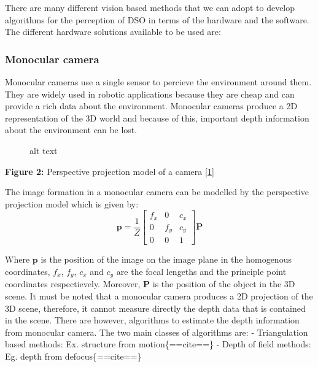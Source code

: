 There are many different vision based methods that we can adopt to
develop algorithms for the perception of DSO in terms of the hardware
and the software. The different hardware solutions available to be used
are:

\subsubsection{Monocular camera}\label{monocular-camera}

Monocular cameras use a single sensor to percieve the environment around
them. They are widely used in robotic applications because they are
cheap and can provide a rich data about the environment. Monocular
cameras produce a 2D representation of the 3D world and because of this,
important depth information about the environment can be lost.

\begin{figure}
\centering
{}
\caption{alt text}
\end{figure}

\textbf{Figure 2:} Perspective projection model of a camera
\href{https://jordicenzano.name/front-test/2d-3d-paradigm-overview-2011/camera-model/}{{[}1{]}}

The image formation in a monocular camera can be modelled by the
perspective projection model which is given by: \[
\mathbf{p} = \frac{1}{Z}\begin{bmatrix}
f_x & 0 & c_x  \\
 0 & f_y & c_y \\ 
 0 &0& 1
 \end{bmatrix} \mathbf{P}
\]

Where \(\mathbf{p}\) is the position of the image on the image plane in
the homogenous coordinates, \(f_x\), \(f_y\), \(c_x\) and \(c_y\) are
the focal lengeths and the principle point coordinates respectievely.
Moreover, \(\mathbf{P}\) is the position of the object in the 3D scene.
It must be noted that a monocular camera produces a 2D projection of the
3D scene, therefore, it cannot measure directly the depth data that is
contained in the scene. There are however, algorithms to estimate the
depth information from monocular camera. The two main classes of
algorithms are: - Triangulation based methods: Ex. structure from
motion\{==cite==\} - Depth of field methods: Eg. depth from
defocus\{==cite==\}

